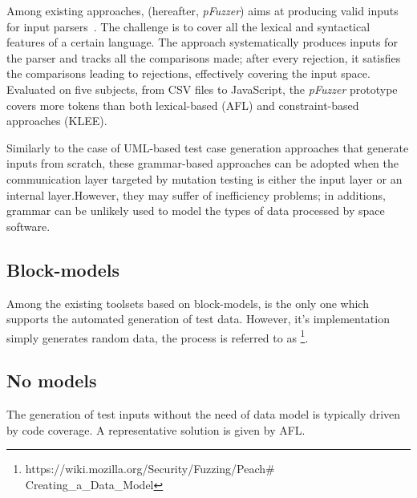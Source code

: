 %
%



Among existing approaches,  (hereafter, \emph{pFuzzer}) aims at producing valid inputs for input parsers~\cite{mathis2019parser}. The challenge is to cover all the lexical and syntactical features of a certain language. The approach systematically produces inputs for the parser and tracks all the comparisons made; after every rejection, it satisfies the comparisons leading to rejections, effectively covering the input space.
Evaluated on five subjects, from CSV files to JavaScript, the \emph{pFuzzer} prototype covers more tokens than both lexical-based (AFL) and constraint-based approaches (KLEE).


Similarly to the case of UML-based test case generation approaches that generate inputs from scratch, these grammar-based approaches can be adopted when the communication layer targeted by mutation testing is either the input layer or an internal layer.However, they may suffer of inefficiency problems; in additions, grammar can be unlikely used to model the types of data processed by space software.


\subsection{Block-models}

Among the existing toolsets based on block-models,  is the only one which supports the automated generation of test data. However, it's implementation simply generates random data, the process is referred to as
\footnote{https://wiki.mozilla.org/Security/Fuzzing/Peach$\#$Creating\_a\_Data\_Model}.


\subsection{No models}


The generation of test inputs without the need of data model is typically driven by code coverage. A representative solution is given by AFL.

